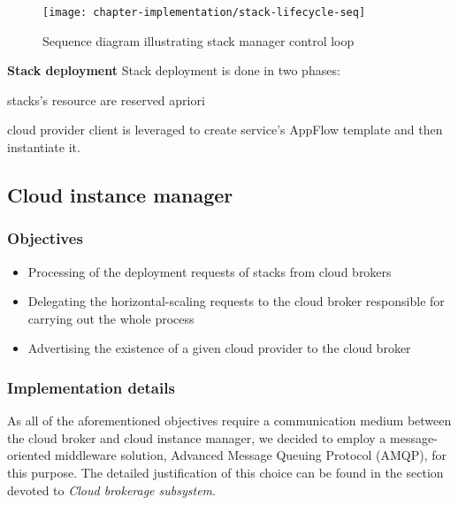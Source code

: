 \begin{asparaenum}
\begin{figure}[!ht]
  \begin{center}
    \texttt{[image: chapter-implementation/stack-lifecycle-seq]}
  \end{center}
  \caption{Sequence diagram illustrating stack manager control loop}
  \label{fig:stack-lifecycle-seq}
\end{figure}


 \item[\textbf{Stack deployment}] Stack deployment is done in two phases:
 \begin{inparaenum}
  \item stacks's resource are reserved apriori
  \item cloud provider client is leveraged to create service's AppFlow template and then instantiate it.
 \end{inparaenum}

\end{asparaenum}

\subsection{Cloud instance manager}

\subsubsection{Objectives}
\begin{itemize}
  \item Processing of the deployment requests of stacks from cloud brokers
  \item Delegating the horizontal-scaling requests to the cloud broker responsible for carrying out the whole process
  \item Advertising the existence of a given cloud provider to the cloud broker
\end{itemize}

\subsubsection{Implementation details}
As all of the aforementioned objectives require a communication medium between the cloud broker and cloud instance manager, we decided to employ a message-oriented middleware solution, Advanced Message Queuing Protocol (AMQP), for this purpose. The detailed justification of this choice can be found in the section devoted to \emph{Cloud brokerage subsystem}.  

